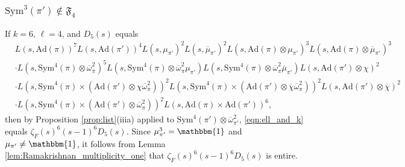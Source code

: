 \documentclass[11pt]{amsart}
\theoremstyle{remark}
\numberwithin{equation}{section}
\begin{document}
\subsubsection{$\mathrm{Sym}^3(\pi')\notin\mathfrak{F}_{4}$}
If $k=6$, $\ell=4$, and $D_5(s)$ equals
\begin{align*}
&L(s,\mathrm{Ad}(\pi))^7 L(s,\mathrm{Ad}(\pi'))^4 L(s,\mu_{\pi'})^2 L(s,\overline{\mu}_{\pi'})^2 L(s,\mathrm{Ad}(\pi)\otimes\mu_{\pi'})^3 L(s,\mathrm{Ad}(\pi)\otimes\overline{\mu}_{\pi'})^3\\
&\cdot L(s,\mathrm{Sym}^4(\pi)\otimes\overline{\omega}_{\pi}^{2})^5 L(s,\mathrm{Sym}^4(\pi)\otimes\overline{\omega}_{\pi}^{2}\mu_{\pi'}) L(s,\mathrm{Sym}^4(\pi)\otimes\overline{\omega}_{\pi}^{2} \overline{\mu}_{\pi'})L(s,\mathrm{Ad}(\pi')\otimes\chi)^2 \\
&\cdot L(s,\mathrm{Sym}^4(\pi)\times(\mathrm{Ad}(\pi')\otimes\chi \overline{\omega}_{\pi}^{2}))^2 L(s,\mathrm{Sym}^4(\pi)\times(\mathrm{Ad}(\pi')\otimes\overline{\chi} \overline{\omega}_{\pi}^{2}))^2 L(s,\mathrm{Ad}(\pi')\otimes\overline{\chi})^2\\
&\cdot L(s,\mathrm{Sym}^4(\pi)\times(\mathrm{Ad}(\pi')\otimes\overline{\omega}_{\pi}^{2}))^2 L(s,\mathrm{Ad}(\pi)\times\mathrm{Ad}(\pi'))^6,
\end{align*}
then by Proposition \ref{prop:list}(iiia) applied to $\mathrm{Sym}^4(\pi')\otimes\overline{\omega}_{\pi'}^{2}$,  \eqref{eqn:ell_and_k} equals $\zeta_F(s)^6 (s-1)^6 D_5(s)$.  Since $\mu_{\pi'}^3=\mathbbm{1}$ and $\mu_{\pi'}\neq\mathbbm{1}$, it follows from Lemma \ref{lem:Ramakrishnan_multiplicity_one} that $\zeta_F(s)^6 (s-1)^6 D_5(s)$ is entire.
\end{document}
